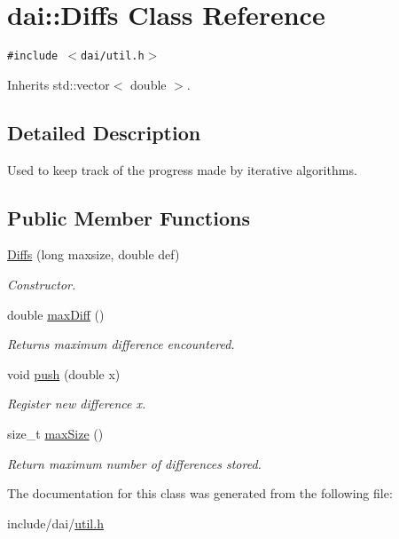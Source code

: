 \hypertarget{classdai_1_1Diffs}{
\section{dai::Diffs Class Reference}
\label{classdai_1_1Diffs}
}
{\tt \#include $<$dai/util.h$>$}

Inherits std::vector$<$ double $>$.



\subsection{Detailed Description}
Used to keep track of the progress made by iterative algorithms. \subsection*{Public Member Functions}
\begin{CompactItemize}
\item 
\hypertarget{classdai_1_1Diffs_4b57c2ecdc2b6d70c404824330876235}{
\hyperlink{classdai_1_1Diffs_4b57c2ecdc2b6d70c404824330876235}{Diffs} (long maxsize, double def)}
\label{classdai_1_1Diffs_4b57c2ecdc2b6d70c404824330876235}

\begin{CompactList}\small\item\em Constructor. \item\end{CompactList}\item 
\hypertarget{classdai_1_1Diffs_b6d18664bd4f72da5b7105a0791c21fe}{
double \hyperlink{classdai_1_1Diffs_b6d18664bd4f72da5b7105a0791c21fe}{maxDiff} ()}
\label{classdai_1_1Diffs_b6d18664bd4f72da5b7105a0791c21fe}

\begin{CompactList}\small\item\em Returns maximum difference encountered. \item\end{CompactList}\item 
\hypertarget{classdai_1_1Diffs_badc1817a2021474a11c5296c4d6cf7c}{
void \hyperlink{classdai_1_1Diffs_badc1817a2021474a11c5296c4d6cf7c}{push} (double x)}
\label{classdai_1_1Diffs_badc1817a2021474a11c5296c4d6cf7c}

\begin{CompactList}\small\item\em Register new difference x. \item\end{CompactList}\item 
\hypertarget{classdai_1_1Diffs_2833e1db5b0b3661ad7d4bdbfb00f9c6}{
size\_\-t \hyperlink{classdai_1_1Diffs_2833e1db5b0b3661ad7d4bdbfb00f9c6}{maxSize} ()}
\label{classdai_1_1Diffs_2833e1db5b0b3661ad7d4bdbfb00f9c6}

\begin{CompactList}\small\item\em Return maximum number of differences stored. \item\end{CompactList}\end{CompactItemize}


The documentation for this class was generated from the following file:\begin{CompactItemize}
\item 
include/dai/\hyperlink{util_8h}{util.h}\end{CompactItemize}
